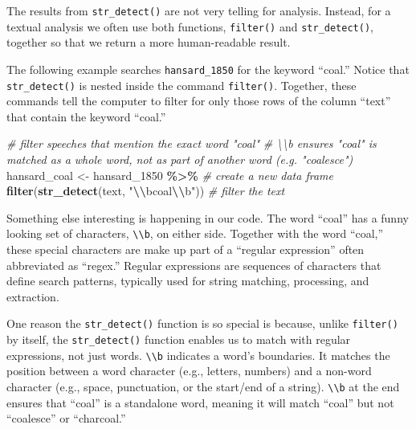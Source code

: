 \documentclass[
]{article}
\newenvironment{Shaded}{\begin{snugshade}}{\end{snugshade}}
\newcommand{\CommentTok}[1]{\textcolor[rgb]{0.56,0.35,0.01}{\textit{#1}}}
\newcommand{\FunctionTok}[1]{\textcolor[rgb]{0.13,0.29,0.53}{\textbf{#1}}}
\newcommand{\NormalTok}[1]{#1}
\newcommand{\OtherTok}[1]{\textcolor[rgb]{0.56,0.35,0.01}{#1}}
\newcommand{\SpecialCharTok}[1]{\textcolor[rgb]{0.81,0.36,0.00}{\textbf{#1}}}
\newcommand{\StringTok}[1]{\textcolor[rgb]{0.31,0.60,0.02}{#1}}
\begin{document}
The results from \texttt{str\_detect()} are not very telling for
analysis. Instead, for a textual analysis we often use both functions,
\texttt{filter()} and \texttt{str\_detect()}, together so that we return
a more human-readable result.

The following example searches \texttt{hansard\_1850} for the keyword
``coal.'' Notice that \texttt{str\_detect()} is nested inside the
command \texttt{filter()}. Together, these commands tell the computer to
filter for only those rows of the column ``text'' that contain the
keyword ``coal.''

\begin{Shaded}
\begin{Highlighting}[]
\CommentTok{\# filter speeches that mention the exact word "coal"}
\CommentTok{\# \textbackslash{}\textbackslash{}b ensures "coal" is matched as a whole word, not as part of another word (e.g. "coalesce")}
\NormalTok{hansard\_coal }\OtherTok{\textless{}{-}}\NormalTok{ hansard\_1850 }\SpecialCharTok{\%\textgreater{}\%} \CommentTok{\# create a new data frame}
  \FunctionTok{filter}\NormalTok{(}\FunctionTok{str\_detect}\NormalTok{(text, }\StringTok{"}\SpecialCharTok{\textbackslash{}\textbackslash{}}\StringTok{bcoal}\SpecialCharTok{\textbackslash{}\textbackslash{}}\StringTok{b"}\NormalTok{)) }\CommentTok{\# filter the text }
\end{Highlighting}
\end{Shaded}

Something else interesting is happening in our code. The word ``coal''
has a funny looking set of characters,
\texttt{\textbackslash{}\textbackslash{}b}, on either side. Together
with the word ``coal,'' these special characters are make up part of a
``regular expression'' often abbreviated as ``regex.'' Regular
expressions are sequences of characters that define search patterns,
typically used for string matching, processing, and extraction.

One reason the \texttt{str\_detect()} function is so special is because,
unlike \texttt{filter()} by itself, the \texttt{str\_detect()} function
enables us to match with regular expressions, not just words.
\texttt{\textbackslash{}\textbackslash{}b} indicates a word's
boundaries. It matches the position between a word character (e.g.,
letters, numbers) and a non-word character (e.g., space, punctuation, or
the start/end of a string). \texttt{\textbackslash{}\textbackslash{}b}
at the end ensures that ``coal'' is a standalone word, meaning it will
match ``coal'' but not ``coalesce'' or ``charcoal.''
\end{document}
